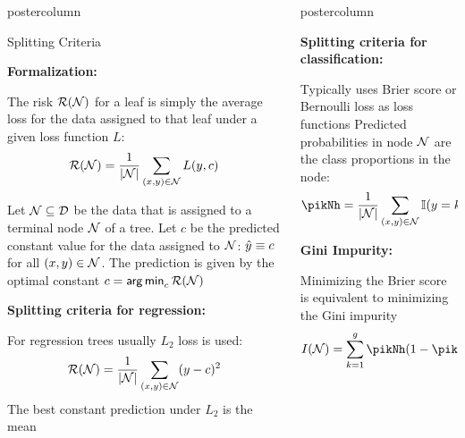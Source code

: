 \documentclass{beamer}
\newlength{\columnheight} %
\begin{document}
\begin{frame}[fragile]{}
\begin{columns}
\begin{column}{.31\textwidth}
\begin{beamercolorbox}[center]{postercolumn}
\begin{minipage}{.98\textwidth}
{\begin{myblock}{Splitting Criteria}
\begin{codebox} \textbf{Formalization: }
\end{codebox}
The risk $\mathcal{R}(\mathcal{N})$ for a leaf is simply the average loss for the data assigned to that leaf under a given loss function $L$: $$\mathcal{R}(\mathcal{N}) = \frac{1}{|\mathcal{N}|} \sum\limits_{(x,y) \in \mathcal{N}} L(y, c)$$
  
  Let $\mathcal{N} \subseteq \mathcal{D}$ be the data that is assigned to a terminal node $\mathcal{N}$ of a tree.
Let $c$ be the predicted constant value for the data assigned to $\mathcal{N}$: $\hat{y} \equiv c$ for all $\left(x,y\right) \in \mathcal{N}$.\vspace*{1ex}
The prediction is given by the optimal constant $c = \mathop{\sf arg\,min}_c \mathcal{R}(\mathcal{N})$

\begin{codebox}
\textbf{Splitting criteria for regression: }\end{codebox}
For regression trees usually $L_2$ loss is used: 
  $$\mathcal{R}(\mathcal{N}) = \frac{1}{|\mathcal{N}|} \sum\limits_{(x,y) \in \mathcal{N}} (y - c)^2$$\vspace*{1ex}
The best constant prediction under $L_2$ is the mean

\end{myblock}\vfill
				}
			\end{minipage}
		\end{beamercolorbox}
	\end{column}
	

\begin{column}{.31\textwidth}
\begin{beamercolorbox}[center]{postercolumn}
\begin{minipage}{.98\textwidth}
\parbox[t][\columnheight]{\textwidth}{
  \begin{myblock}{ }
  \begin{codebox}
  \textbf{Splitting criteria for classification:}
  \end{codebox} Typically uses Brier score or  Bernoulli loss as loss functions
  Predicted probabilities in node $\mathcal{N}$ are the class proportions in the node:
    $$ \pikNh = \frac{1}{|\Np|} \sum\limits_{(x,y) \in \Np} \I(y = k) $$
    
    \begin{codebox}
  \textbf{Gini Impurity:}
  \end{codebox}
  Minimizing the Brier score is equivalent to minimizing the Gini impurity $$I(\Np) = \sum_{k=1}^g \pikNh(1-\pikNh)$$
    

\end{myblock}}
\end{minipage}
\end{beamercolorbox}
\end{column}
\end{columns}
\end{frame}
\end{document}
